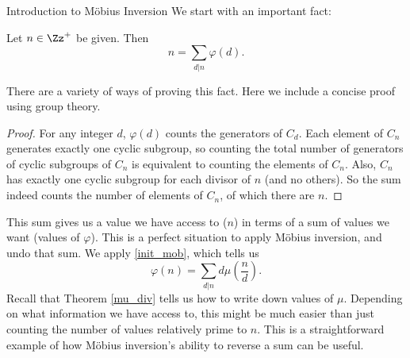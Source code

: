 \documentclass[12pt]{pom_thesis}
\begin{document}
\begin{chapter}{Introduction to M\"obius Inversion}
We start with an important fact:
\begin{thm}[Gauss]\label{gauss}
Let $n \in \Zz^+$ be given. Then 
\[
n = \sum_{d|n}\varphi(d).
\]
\end{thm}
There are a variety of ways of proving this fact. Here we include a concise proof using group theory.
\begin{proof}
For any integer $d$, $\varphi(d)$ counts the generators of $C_d$. Each element of $C_n$ generates exactly one cyclic subgroup, so counting the total number of generators of cyclic subgroups of $C_n$ is equivalent to counting the elements of $C_n$. Also, $C_n$ has exactly one cyclic subgroup for each divisor of $n$ (and no others). So the sum indeed counts the number of elements of $C_n$, of which there are $n$.
\end{proof}
This sum gives us a value we have access to ($n$) in terms of a sum of values we want (values of $\varphi$). This is a perfect situation to apply M\"obius inversion, and undo that sum. We apply \eqref{init_mob}, which tells us
\[
\varphi(n) = \sum_{d|n} d\mu\left(\frac nd\right).
\]
Recall that Theorem \ref{mu_div} tells us how to write down values of $\mu$. Depending on what information we have access to, this might be much easier than just counting the number of values relatively prime to $n$. This is a straightforward example of how M\"obius inversion's ability to reverse a sum can be useful.
\end{chapter}
\end{document}
